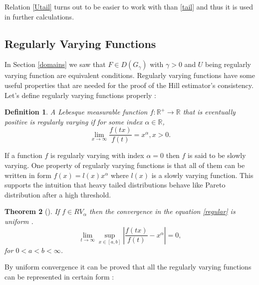 \documentclass[english,12pt,a4paper,pdftex,sci,utf8]{aaltothesis} %
\newtheorem{theorem}{Theorem}[section]
\newtheorem{definition}[theorem]{Definition}
\begin{document}
Relation \eqref{Utail} turns out to be easier to work with than \eqref{tail} and thus it is used in further calculations.


\subsection{Regularly Varying Functions}

In Section \ref{domains} we saw that $F \in D(G_{\gamma})$ with $\gamma>0$ and $U$ being regularly varying function are equivalent conditions. Regularly varying functions have some useful properties that are needed for the proof of the Hill estimator's consistency. Let's define regularly varying functions properly \cite{deHaan}:
\begin{definition}
A Lebesque measurable function $f: \mathbb{R}^{+} \rightarrow \mathbb{R}$ that is eventually positive is regularly varying if for some index $\alpha \in \mathbb{R}$,
\begin{equation}
\lim_{x \rightarrow \infty} \frac{f(tx)}{f(t)} = x^{\alpha}, x>0.
\label{regular}
\end{equation}
\label{regularDef}
\end{definition}

If a function $f$  is regularly varying with index $\alpha=0$ then $f$ is said to be slowly varying. One property of regularly varying functions is that all of them can be written in form $f(x)=l(x)x^{\alpha}$ where $l(x)$ is a slowly varying function. This supports the intuition that heavy tailed distributions behave like Pareto distribution after a high threshold. 



\begin{theorem}[{\cite[Theorem B.1.4]{deHaan}}]
If $f \in RV_{\alpha}$ then the convergence in the equation \eqref{regular} is uniform .
\begin{equation*}
\lim_{t \rightarrow \infty} \sup_{x  \in [a,b]} \left| \frac{f(tx)}{f(t)} - x^{\alpha} \right| = 0,
\end{equation*}
for $0<a<b<\infty$.
\label{uniform}
\end{theorem}



By uniform convergence it can be proved that all the regularly varying functions can be represented in certain form \cite{deHaan}:
\end{document}
